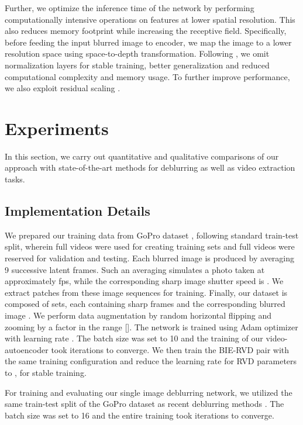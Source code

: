\documentclass[10pt,twocolumn,letterpaper]{article}
\begin{document}
Further, we optimize the inference time of the network by performing computationally intensive operations on features at lower spatial resolution. This also reduces memory footprint while increasing the receptive field. Specifically, before feeding the input blurred image to encoder, we map the image to a lower resolution space using space-to-depth transformation. Following \cite{lim2017enhanced,nah2017deep}, we omit normalization layers for stable training, better generalization and reduced computational complexity and memory usage. To further improve performance, we also exploit residual scaling \cite{lim2017enhanced}.

\section{Experiments}

In this section, we carry out quantitative and qualitative comparisons of our approach with state-of-the-art methods for deblurring as well as video extraction tasks.  

\subsection{Implementation Details} 
We prepared our training data from GoPro dataset \cite{nah2017deep}, following standard train-test split, wherein  full videos were used for creating training sets and  full videos were reserved for validation and testing. 
Each blurred image is produced by averaging 9 successive latent frames. Such an averaging simulates a photo taken at approximately  fps, while the corresponding sharp image shutter speed is . We extract  patches from these image sequences for training. 
Finally, our dataset is composed of  sets, each containing  sharp frames and the corresponding blurred image .
We perform data augmentation by random horizontal flipping and zooming by a factor in the range [].
The network is trained using Adam optimizer with learning rate . The batch size was set to 10 and the training of our video-autoencoder took  iterations to converge. We then train the BIE-RVD pair with the same training configuration and reduce the learning rate for RVD parameters to , for stable training.

For training and evaluating our single image deblurring network, we utilized the same train-test split of the GoPro dataset \cite{nah2017deep} as recent deblurring methods \cite{nah2017deep}\cite{tao2018scale}. The batch size was set to 16 and the entire training took  iterations to converge.
\vspace{-3mm}
\end{document}
